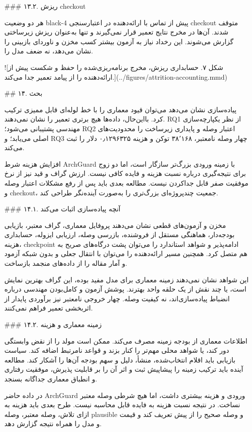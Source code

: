 \documentclass[11pt,a4paper]{article}
\begin{document}
\#\#\# ۱۳.۲. ریزش checkout

هر دو وضعیت black-4 پیش از تماس با ارائه‌دهنده در اعتبارسنجی checkout متوقف شدند. آن‌ها در مخرج نتایج
تعمیر قرار نمی‌گیرند و تنها به‌عنوان ریزش زیرساختی گزارش می‌شوند. این رخداد نیاز به آزمون بیشتر کسب
مخزن و ناوردای بازبینی را نشان می‌دهد، نه ضعف مدل را.

![شکل ۷. حسابداری ریزش، مخرج برنامه‌ریزی‌شده را حفظ و شکست پیش از ارائه‌دهنده را از پیامد تعمیر جدا می‌کند.](../figures/attrition-accounting.mmd)

\#\# ۱۴. بحث

پیاده‌سازی نشان می‌دهد می‌توان قیود معماری را با خط لوله‌ای قابل ممیزی ترکیب کرد. بااین‌حال، داده‌ها
هیچ برتری تعمیر را نشان نمی‌دهند. RQ1 از نظر یکپارچه‌سازی مهندسی پشتیبانی می‌شود؛ RQ2 اعتبار وصله و
پایداری زیرساخت را محدودیت‌های اصلی می‌یابد؛ و RQ3 چهار وصله نامعتبر، ۳۸٬۱۶۸ توکن و هزینه
۰٫۱۲۹۶۳۲۵ دلار را ثبت می‌کند.

افزایش هزینه شرط ArchGuard با زمینه ورودی بزرگ‌تر سازگار است، اما دو زوج برای نتیجه‌گیری درباره نسبت
هزینه و فایده کافی نیست. ارزش گراف و قید نیز از نرخ موفقیت صفر قابل جداکردن نیست. مطالعه بعدی باید پس
از رفع مشکلات اعتبار وصله و checkout، جمعیت چندپروژه‌ای بزرگ‌تری را به‌صورت آینده‌نگر طراحی کند.

\#\#\# ۱۴.۱. آنچه پیاده‌سازی اثبات می‌کند

مخزن و آزمون‌های قطعی نشان می‌دهند پروفایل معماری، گراف معتبر، بازیابی بودجه‌دار، هماهنگی مستقل از
فروشنده، بازرسی وصله، ارزیابی ایزوله، حسابداری هزینه، checkpoint ادامه‌پذیر و شواهد استاندارد را می‌توان
پشت درگاه‌های صریح به هم متصل کرد. همچنین مسیر ارائه‌دهنده را می‌توان با انتقال جعلی و بدون شبکه آزمود
و آمار مقاله را از داده‌های منجمد بازساخت.

این شواهد نشان نمی‌دهند زمینه معماری برای مدل مفید بوده، این گراف بهترین نمایش است، یا چند نقش از یک
حلقه واحد بهترند. پوشش آزمون و کامل‌بودن مهندسی درباره انضباط پیاده‌سازی‌اند، نه کیفیت وصله. چهار خروجی
نامعتبر نیز برآوردی پایدار از اثربخشی تعمیر فراهم نمی‌کنند.

\#\#\# ۱۴.۲. زمینه معماری و هزینه

اطلاعات معماری از بودجه زمینه مصرف می‌کند. ممکن است مولد را از نقض وابستگی دور کند، یا شواهد محلی
مهم‌تر را کنار بزند و قواعد نامرتبط اضافه کند. سیاست بازیابی باید اقلام انتخاب‌شده، منشأ، دلیل و سهم
بودجه آن‌ها را آشکار کند. مطالعه آینده باید ترکیب زمینه را پیشاپیش ثبت و اثر آن را بر قابلیت پذیرش،
موفقیت رفتاری و انطباق معماری جداگانه بسنجد.

در داده حاضر ArchGuard ورودی و هزینه بیشتری داشت، اما هیچ شرطی وصله معتبر نساخت. در نتیجه نسبت هزینه
به فایده قابل محاسبه نیست. طرح بعدی باید هزینه به ازای تلاش، وصله معتبر، وصله plausible و وصله صحیح
را از پیش تعریف کند و قیمت و مدل را همراه نتیجه گزارش دهد.
\end{document}
